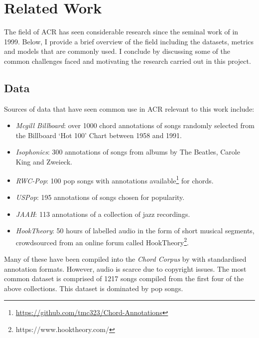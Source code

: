 \section{Related Work}\label{sec:related_work}

The field of ACR has seen considerable research since the seminal work of \citet{FujishimaACR} in 1999. Below, I provide a brief overview of the field including the datasets, metrics and models that are commonly used. I conclude by discussing some of the common challenges faced and motivating the research carried out in this project. 

\subsection{Data}\label{sec:background-data}

Sources of data that have seen common use in ACR relevant to this work include:

\begin{itemize}
    \item \emph{Mcgill Billboard}: over 1000 chord annotations of songs randomly selected from the Billboard `Hot 100' Chart between 1958 and 1991.~\citep{McgillBillboard}
    \item \emph{Isophonics}: 300 annotations of songs from albums by The Beatles, Carole King and Zweieck.~\citep{Isophonics}
    \item \emph{RWC-Pop}: 100 pop songs with annotations available\footnote{\url{https://github.com/tmc323/Chord-Annotations}} for chords.~\citep{RWC}
    \item \emph{USPop}: 195 annotations of songs chosen for popularity.~\citep{USPop}
    \item \emph{JAAH}: 113 annotations of a collection of jazz recordings.~\citep{JAAH}
    \item \emph{HookTheory}: 50 hours of labelled audio in the form of short musical segments, crowdsourced from an online forum called HookTheory\footnote{https://www.hooktheory.com/}.~\citep{MelodyTranscriptionViaGenerativePreTraining}
\end{itemize}

Many of these have been compiled into the \emph{Chord Corpus} by \citet{Choco} with standardised annotation formats. However, audio is scarce due to copyright issues. The most common dataset is comprised of 1217 songs compiled from the first four of the above collections. This dataset is dominated by pop songs.

